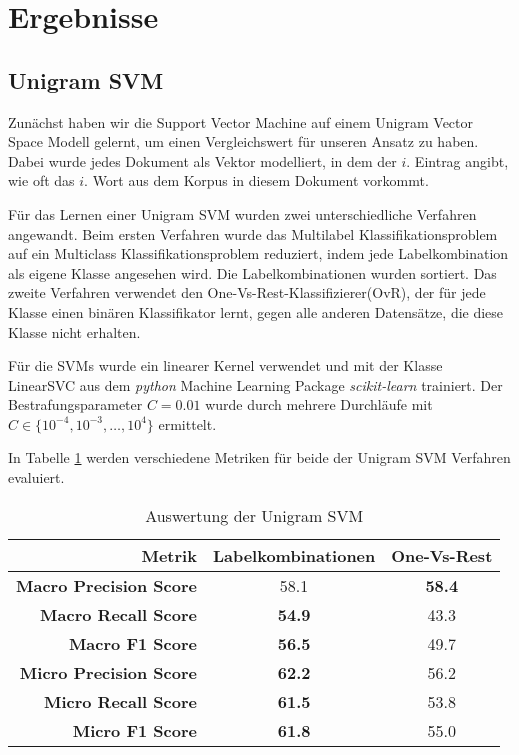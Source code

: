 \section{Ergebnisse}

\subsection{Unigram SVM}
\label{sub:unigram_svm}

Zunächst haben wir die Support Vector Machine auf einem Unigram Vector Space Modell gelernt,
um einen Vergleichswert für unseren Ansatz zu haben.
Dabei wurde jedes Dokument als Vektor modelliert, in dem der $i$. Eintrag angibt, wie oft das $i$. Wort aus dem Korpus in diesem Dokument vorkommt.

Für das Lernen einer Unigram SVM wurden zwei unterschiedliche Verfahren angewandt.
Beim ersten Verfahren wurde das Multilabel Klassifikationsproblem auf ein Multiclass Klassifikationsproblem reduziert,
indem jede Labelkombination als eigene Klasse angesehen wird.
Die Labelkombinationen wurden sortiert.
Das zweite Verfahren verwendet den One-Vs-Rest-Klassifizierer(OvR), der für jede Klasse einen binären Klassifikator lernt,
gegen alle anderen Datensätze, die diese Klasse nicht erhalten.

Für die SVMs wurde ein linearer Kernel verwendet und mit der Klasse LinearSVC aus dem \emph{python} Machine Learning Package \emph{scikit-learn} \cite{scikit-learn} trainiert.
Der Bestrafungsparameter $C = 0.01$ wurde durch mehrere Durchläufe mit $C \in \{ 10^{-4},10^{-3}, \dots, 10^4 \}$ ermittelt.

In Tabelle \ref{tab:unigram_svm} werden verschiedene Metriken für beide der Unigram SVM Verfahren evaluiert.

\begin{table}[h]
    \centering
    \begin{tabular}{r|cc}
        \small \textbf{Metrik} & \small\textbf{Labelkombinationen} & \small\textbf{One-Vs-Rest}\\
        \hline
        \small \textbf{Macro Precision Score}  & \small 58.1 & \small  \textbf{58.4}\\
        \small \textbf{Macro Recall Score}     & \small \textbf{54.9} & \small 43.3\\
        \small \textbf{Macro F1 Score}        & \small \textbf{56.5} & \small 49.7\\
        \small \textbf{Micro Precision Score} & \small \textbf{62.2} & \small 56.2\\
        \small \textbf{Micro Recall Score}    & \small \textbf{61.5} & \small 53.8\\
        \small \textbf{Micro F1 Score}        & \small \textbf{61.8} & \small 55.0\\
    \end{tabular}
    \caption{Auswertung der Unigram SVM}
    \label{tab:unigram_svm}
\end{table}

